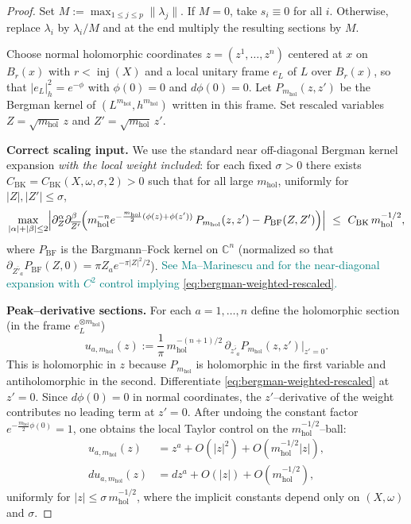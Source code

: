 \documentclass[11pt]{article}
\newcommand{\REVMZ}[1]{\textcolor{teal}{#1}}  %
\numberwithin{equation}{section}  %
\theoremstyle{plain}
\theoremstyle{definition}
\theoremstyle{remark}
\newcommand{\C}{\mathbb{C}}
\newcommand{\mhol}{m_{\mathrm{hol}}} %
\begin{document}
\begin{proof}

{
Set $M:=\max_{1\le j\le p}\|\lambda_j\|$. If $M=0$, take $s_i\equiv 0$ for all $i$.
Otherwise, replace $\lambda_i$ by $\lambda_i/M$ and at the end multiply the resulting sections by $M$.

Choose normal holomorphic coordinates $z=(z^1,\dots,z^n)$ centered at $x$ on $B_r(x)$ with $r<\operatorname{inj}(X)$ and a local
unitary frame $e_L$ of $L$ over $B_r(x)$, so that $|e_L|_h^2=e^{-\phi}$ with $\phi(0)=0$ and $d\phi(0)=0$.
Let $P_{\mhol}(z,z')$ be the Bergman kernel \REVMZ{\cite{MaMarinescu07}}
 of $(L^{\mhol},h^{\mhol})$ written in this frame.
Set rescaled variables $Z=\sqrt{\mhol}\,z$ and $Z'=\sqrt{\mhol}\,z'$.

\noindent\textbf{Correct scaling input.}
We use the standard near off-diagonal Bergman kernel expansion \emph{with the local weight included}:
for each fixed $\sigma>0$ there exists $C_{\mathrm{BK}}=C_{\mathrm{BK}}(X,\omega,\sigma,2)>0$ such that for all large $\mhol$,
uniformly for $|Z|,|Z'|\le \sigma$,
\begin{equation}\label{eq:bergman-weighted-rescaled}
\max_{|\alpha|+|\beta|\le 2}\Bigl|
\partial_Z^\alpha\partial_{\overline{Z'} }^\beta\Bigl(
\mhol^{-n}e^{-\frac{\mhol}{2}(\phi(z)+\phi(z'))}\,P_{\mhol}(z,z')-P_{\mathrm{BF}}(Z,Z')
\Bigr)\Bigr|
\ \le\ C_{\mathrm{BK}}\,\mhol^{-1/2},
\end{equation}
where $P_{\mathrm{BF}}$ is the Bargmann--Fock kernel on $\C^n$ (normalized so that
$\partial_{\overline{Z'_a}}P_{\mathrm{BF}}(Z,0)=\pi Z_a e^{-\pi|Z|^2/2}$).
\REVMZ{See Ma--Marinescu \cite[Thm~4.2.1]{MaMarinescu07} and \cite[Thm~1.1]{MaMarinescu13OffDiag} for the near-diagonal expansion with $C^2$ control implying \eqref{eq:bergman-weighted-rescaled}.}

\noindent\textbf{Peak--derivative sections.}
For each $a=1,\dots,n$ define the holomorphic section (in the frame $e_L^{\otimes \mhol}$)
\[
u_{a,\mhol}(z)
:=\frac{1}{\pi}\,\mhol^{-(n+1)/2}\,
\partial_{\overline{z'_a}} P_{\mhol}(z,z')\Big|_{z'=0}.
\]
This is holomorphic in $z$ because $P_{\mhol}$ is holomorphic in the first variable and antiholomorphic in the second.
Differentiate \eqref{eq:bergman-weighted-rescaled} at $z'=0$.
Since $d\phi(0)=0$ in normal coordinates, the $z'$--derivative of the weight contributes no leading term at $z'=0$.
After undoing the constant factor $e^{-\frac{\mhol}{2}\phi(0)}=1$, one obtains the local Taylor control on the
$\mhol^{-1/2}$--ball:
\begin{align}
u_{a,\mhol}(z) &= z^a + O(|z|^2) + O(\mhol^{-1/2}|z|), \label{eq:u-linear}\\
du_{a,\mhol}(z) &= dz^a + O(|z|) + O(\mhol^{-1/2}), \label{eq:du-linear}
\end{align}
uniformly for $|z|\le \sigma\,\mhol^{-1/2}$, where the implicit constants depend only on $(X,\omega)$ and $\sigma$.

}
\end{proof}
\end{document}

